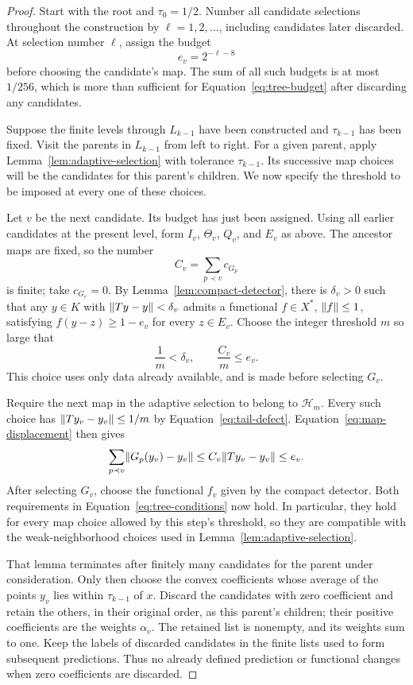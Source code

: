 \begin{proof}
Start with the root and $\tau_0=1/2$.  Number all candidate
selections throughout the construction by $\ell=1,2,\ldots$,
including candidates later discarded.  At selection number $\ell$,
assign the budget
\[
 e_v=2^{-\ell-8}
\]
before choosing the candidate's map.  The sum of all such budgets
is at most $1/256$, which is more than sufficient for
Equation~\eqref{eq:tree-budget} after discarding any candidates.

Suppose the finite levels through $L_{k-1}$ have been constructed
and $\tau_{k-1}$ has been fixed.  Visit the parents in $L_{k-1}$
from left to right.  For a given parent, apply
Lemma~\ref{lem:adaptive-selection} with tolerance $\tau_{k-1}$.
Its successive map choices will be the candidates for this parent's
children.  We now specify the threshold to be imposed at every
one of these choices.

Let $v$ be the next candidate.  Its budget has just been assigned.
Using all earlier candidates at the present level, form $I_v$,
$\Theta_v$, $Q_v$, and $E_v$ as above.  The ancestor maps are fixed,
so the number
\[
 C_v=\sum_{p\prec v}c_{G_p}
\]
is finite; take $c_{G_r}=0$.  By
Lemma~\ref{lem:compact-detector}, there is $\delta_v>0$ such that
any $y\in K$ with $\lVert Ty-y\rVert<\delta_v$ admits a functional
$f\in X^*$, $\lVert f\rVert\le1$, satisfying
$f(y-z)\ge1-e_v$ for every $z\in E_v$.  Choose the integer
threshold $m$ so large that
\[
  \frac1m<\delta_v,\qquad \frac{C_v}{m}\le e_v.
\]
This choice uses only data already available, and is made before
selecting $G_v$.

Require the next map in the adaptive selection to belong to
$\mathcal H_m$.  Every such choice has
$\lVert Ty_v-y_v\rVert\le1/m$ by Equation~\eqref{eq:tail-defect}.
Equation~\eqref{eq:map-displacement} then gives
\[
 \sum_{p\prec v}\lVert G_p(y_v)-y_v\rVert
 \le C_v\lVert Ty_v-y_v\rVert\le e_v.
\]
After selecting $G_v$, choose the functional $f_v$ given by the
compact detector.  Both requirements in
Equation~\eqref{eq:tree-conditions} now hold.  In particular, they
hold for every map choice allowed by this step's threshold, so
they are compatible with the weak-neighborhood choices used in
Lemma~\ref{lem:adaptive-selection}.

That lemma terminates after finitely many candidates for the
parent under consideration.  Only then choose the convex
coefficients whose average of the points $y_v$ lies within
$\tau_{k-1}$ of $x$.  Discard the candidates with zero coefficient
and retain the others, in their original order, as this parent's
children; their positive coefficients are the weights $\alpha_v$.
The retained list is nonempty, and its weights sum to one.  Keep
the labels of discarded candidates in the finite lists used to
form subsequent predictions.  Thus no already defined prediction
or functional changes when zero coefficients are discarded.


\end{proof}
